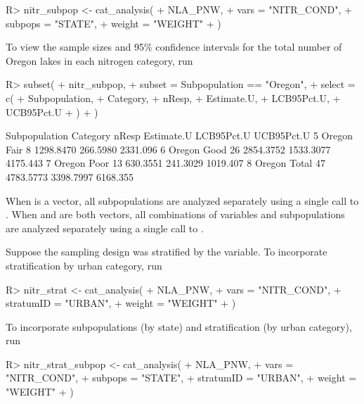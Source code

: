\documentclass[
  shortnames]{jss}
\begin{document}
\begin{CodeChunk}
\begin{CodeInput}
R> nitr_subpop <- cat_analysis(
+   NLA_PNW, 
+   vars = "NITR_COND",
+   subpops = "STATE",
+   weight = "WEIGHT"
+ )
\end{CodeInput}
\end{CodeChunk}

To view the sample sizes and 95\% confidence intervals for the total
number of Oregon lakes in each nitrogen category, run

\begin{CodeChunk}
\begin{CodeInput}
R> subset(
+   nitr_subpop,
+   subset = Subpopulation == "Oregon",
+   select = c(
+     Subpopulation,
+     Category,
+     nResp,
+     Estimate.U,
+     LCB95Pct.U,
+     UCB95Pct.U
+   )
+ )
\end{CodeInput}
\begin{CodeOutput}
  Subpopulation Category nResp Estimate.U LCB95Pct.U UCB95Pct.U
5        Oregon     Fair     8  1298.8470   266.5980   2331.096
6        Oregon     Good    26  2854.3752  1533.3077   4175.443
7        Oregon     Poor    13   630.3551   241.3029   1019.407
8        Oregon    Total    47  4783.5773  3398.7997   6168.355
\end{CodeOutput}
\end{CodeChunk}

When  is a vector, all subpopulations are analyzed
separately using a single call to . When
 and  are both vectors, all combinations of
variables and subpopulations are analyzed separately using a single call
to .

Suppose the sampling design was stratified by the  variable.
To incorporate stratification by urban category, run

\begin{CodeChunk}
\begin{CodeInput}
R> nitr_strat <- cat_analysis(
+   NLA_PNW, 
+   vars = "NITR_COND",
+   stratumID = "URBAN",
+   weight = "WEIGHT"
+ )
\end{CodeInput}
\end{CodeChunk}

To incorporate subpopulations (by state) and stratification (by urban
category), run

\begin{CodeChunk}
\begin{CodeInput}
R> nitr_strat_subpop <- cat_analysis(
+   NLA_PNW, 
+   vars = "NITR_COND",
+   subpops = "STATE",
+   stratumID = "URBAN",
+   weight = "WEIGHT"
+ )
\end{CodeInput}
\end{CodeChunk}
\end{document}

